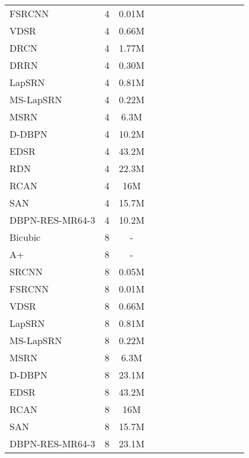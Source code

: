\documentclass[10pt,journal,compsoc]{IEEEtran}
\begin{document}
\begin{table*}[t!]
\begin{tabular}{*1l*1c*1c*2c*2c*2c*2c*2c}
FSRCNN~\cite{dong2016accelerating}&4		&0.01M&&&&&&&&&&\\
VDSR~\cite{Kim_2016_VDSR}&4			&0.66M&&&&&&&&&&\\
DRCN~\cite{kim2016deeply}&4				&1.77M&&&&&&&&&&\\
DRRN~\cite{Tai-DRRN-2017}&4			&0.30M&&&&&&&&&&\\
LapSRN~\cite{LapSRN}&4				&0.81M&&&&&&&&&&\\
MS-LapSRN~\cite{lai2018fast}&4			&0.22M&&&&&&&&&&\\
MSRN~\cite{li2018multi}&4				&6.3M&&&&&&&&&&\\
D-DBPN~\cite{haris2018deep} &4			&10.2M&&&&&&&&&&\\
EDSR~\cite{Lim_2017_CVPR_Workshops}&4	&43.2M&&&&&&&&&&\\
RDN~\cite{zhang2018residual}&4			&22.3M&&{\color{blue}}&&&&&&&&\\
RCAN~\cite{zhang2018image}&4			&16M&&{\color{red}}&&{\color{blue}}&&{\color{blue}}&{\color{blue}}&{\color{blue}}&{\color{blue}}&{\color{blue}}\\
SAN~\cite{dai2019second}&4				&15.7M&{\color{blue}}&{\color{red}}&{\color{blue}}&{\color{blue}}&{\color{blue}}&&&&&{\color{blue}}\\
DBPN-RES-MR64-3 &4					&10.2M&{\color{red}}&{\color{blue}}&{\color{red}}&{\color{red}}&{\color{red}}&{\color{red}}&{\color{red}}&{\color{red}}&{\color{red}}&{\color{red}}\\
\hline
Bicubic&8								&-&&&&&&&&&&\\
A+~\cite{timofte2014a+}&8				&-&&&&&&&&&&\\
SRCNN~\cite{dong2016image}&8			&0.05M&&&&&&&&&&\\
FSRCNN~\cite{dong2016accelerating}&8		&0.01M&&&&&&&&&&\\
VDSR~\cite{Kim_2016_VDSR}&8			&0.66M&&&&&&&&&&\\
LapSRN~\cite{LapSRN}&8				&0.81M&&&&&&&&&&\\
MS-LapSRN~\cite{lai2018fast}&8			&0.22M&&&&&&&&&&\\
MSRN~\cite{li2018multi} &8				&6.3M&&&&&&&&&&\\
D-DBPN~\cite{haris2018deep} &8			&23.1M&&&&&&&&&&\\
EDSR~\cite{Lim_2017_CVPR_Workshops}&8	&43.2M&&&&&&&&&&\\
RCAN~\cite{zhang2018image}&8			&16M&{\color{blue}}&{\color{blue}}&{\color{blue}}&{\color{blue}}&{\color{blue}}&{\color{blue}}&{\color{blue}}&{\color{blue}}&{\color{blue}}&{\color{blue}}\\
SAN~\cite{dai2019second}&8				&15.7M&&&&&&&&&&\\
DBPN-RES-MR64-3 &8					&23.1M&{\color{red}}&{\color{red}}&{\color{red}}&{\color{red}}&{\color{red}}&{\color{red}}&{\color{red}}&{\color{red}}&{\color{red}}&{\color{red}}\\
\hline
\end{tabular}
\end{table*}
\end{document}

